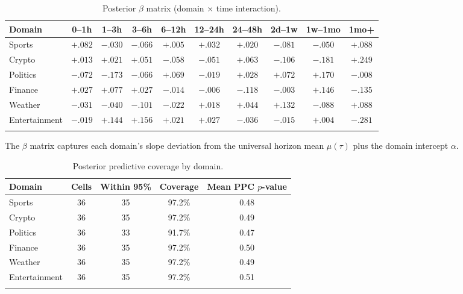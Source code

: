 \documentclass[numsec,webpdf,modern,medium]{oup-authoring-template}
\theoremstyle{thmstyleone}%
\theoremstyle{thmstyletwo}%
\theoremstyle{thmstylethree}%
\begin{document}
\begin{appendices}
\begin{table}
\caption{Posterior $\beta$ matrix (domain $\times$ time interaction).\label{tab:beta}}
\tabcolsep=0pt%
\begin{tabular*}{\textwidth}{@{\extracolsep{\fill}}lccccccccc@{\extracolsep{\fill}}}
\toprule
Domain & 0--1h & 1--3h & 3--6h & 6--12h & 12--24h & 24--48h & 2d--1w & 1w--1mo & 1mo+ \\
\midrule
Sports        & $+.082$ & $-.030$ & $-.066$ & $+.005$ & $+.032$ & $+.020$ & $-.081$ & $-.050$ & $+.088$ \\
Crypto        & $+.013$ & $+.021$ & $+.051$ & $-.058$ & $-.051$ & $+.063$ & $-.106$ & $-.181$ & $+.249$ \\
Politics      & $-.072$ & $-.173$ & $-.066$ & $+.069$ & $-.019$ & $+.028$ & $+.072$ & $+.170$ & $-.008$ \\
Finance       & $+.027$ & $+.077$ & $+.027$ & $-.014$ & $-.006$ & $-.118$ & $-.003$ & $+.146$ & $-.135$ \\
Weather       & $-.031$ & $-.040$ & $-.101$ & $-.022$ & $+.018$ & $+.044$ & $+.132$ & $-.088$ & $+.088$ \\
Entertainment & $-.019$ & $+.144$ & $+.156$ & $+.021$ & $+.027$ & $-.036$ & $-.015$ & $+.004$ & $-.281$ \\
\botrule
\end{tabular*}
\begin{tablenotes}%
\item The $\beta$ matrix captures each domain's slope deviation from the universal horizon mean $\mu(\tau)$ plus the domain intercept $\alpha$.
\end{tablenotes}
\end{table}

\begin{table}[!t]
\caption{Posterior predictive coverage by domain.\label{tab:ppc_domain}}%
\begin{tabular*}{\columnwidth}{@{\extracolsep\fill}lcccc@{\extracolsep\fill}}
\toprule
Domain & Cells & Within 95\% & Coverage & Mean PPC $p$-value \\
\midrule
Sports        & 36 & 35 & 97.2\% & 0.48 \\
Crypto        & 36 & 35 & 97.2\% & 0.49 \\
Politics      & 36 & 33 & 91.7\% & 0.47 \\
Finance       & 36 & 35 & 97.2\% & 0.50 \\
Weather       & 36 & 35 & 97.2\% & 0.49 \\
Entertainment & 36 & 35 & 97.2\% & 0.51 \\
\botrule
\end{tabular*}
\end{table}

\end{appendices}
\end{document}
